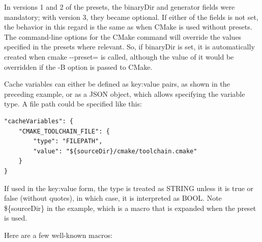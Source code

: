 In versions 1 and 2 of the presets, the binaryDir and generator fields were mandatory; with version 3, they became optional. If either of the fields is not set, the behavior in this regard is the same as when CMake is used without presets. The command-line options for the CMake command will override the values specified in the presets where relevant. So, if binaryDir is set, it is automatically created when cmake -{}-preset= is called, although the value of it would be overridden if the -B option is passed to CMake.

Cache variables can either be defined as key:value pairs, as shown in the preceding example, or as a JSON object, which allows specifying the variable type. A file path could be specified like this:

\begin{lstlisting}[style=styleCMake]
"cacheVariables": {
	"CMAKE_TOOLCHAIN_FILE": {
		"type": "FILEPATH",
		"value": "${sourceDir}/cmake/toolchain.cmake"
	}
}
\end{lstlisting}

If used in the key:value form, the type is treated as STRING unless it is true or false (without quotes), in which case, it is interpreted as BOOL. Note \$\{sourceDir\} in the example, which is a macro that is expanded when the preset is used.

Here are a few well-known macros:

